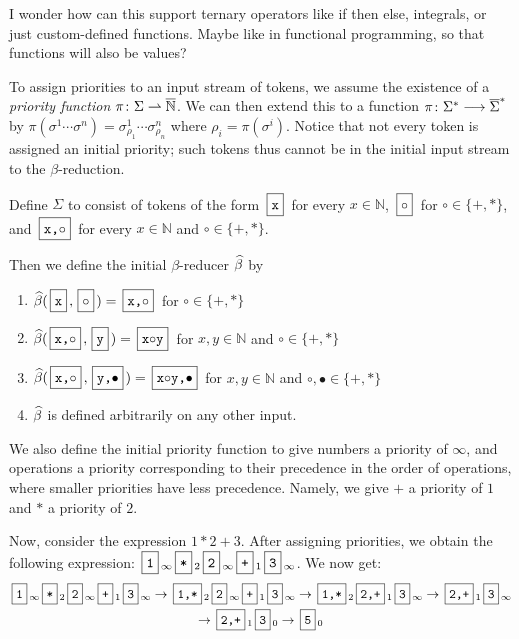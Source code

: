 \documentclass{llncs}
\newcommand{\yoni}[1]{{\begin{mdframed}[linecolor=red]{\color{red}#1}\end{mdframed}}}
\begin{document}
\yoni{I wonder how can this support ternary operators like if then else, integrals, or just custom-defined functions. Maybe like in functional programming, so that functions will also be values?}

To assign priorities to an input stream of tokens, we assume the existence of a \textit{priority function} $\pi\colon\Sigma\rightharpoonup\overline{\mathbb N}$.
We can then extend this to a function $\pi\colon\Sigma^*\longrightarrow\overline\Sigma^*$ by $\pi(\sigma^1\cdots\sigma^n)=\sigma^1_{\rho_1}\cdots\sigma^n_{\rho_n}$ where $\rho_i=\pi(\sigma^i)$.
Notice that not every token is assigned an initial priority; such tokens thus cannot be in the initial input stream to the $\beta$-reduction.



\begin{example}

    Define $\Sigma$ to consist of tokens of the form $\mbt{x}$ for every $x\in\mathbb{N}$, $\mb\circ$ for $\circ\in\{+,*\}$, and $\mbt{x,$\circ$}$ for every $x\in\mathbb{N}$
    and $\circ\in\{+,*\}$.
    
    Then we define the initial $\beta$-reducer $\widehat\beta$ by
    \begin{enumerate}
        \item $\hb(\mbt x,\mb\circ)=\mbt{x,$\circ$}$ for $\circ\in\{+,*\}$
        \item $\hb(\mbt{x,$\circ$},\mbt y)=\mbt{x$\circ$y}$ for 
        $x,y\in\mathbb{N}$ and $\circ\in\{+,*\}$
        \item $\hb(\mbt{x,$\circ$},\mbt{y,$\bullet$})=\mbt{x$\circ$y,$\bullet$}$ 
        for $x,y\in\mathbb{N}$ and $\circ,\bullet\in\{+,*\}$
        \item $\widehat\beta$ is defined arbitrarily on any other input.
    \end{enumerate}
    
    We also define the initial priority function to give numbers a priority of $\infty$, and operations a priority corresponding to their precedence in the order of operations,
    where smaller priorities have less precedence.
    Namely, we give $+$ a priority of $1$ and $*$ a priority of $2$.
    
    Now, consider the expression $1*2+3$. 
    After assigning priorities, we obtain the following expression:
    $\mbt1_\infty \mbt*_2 \mbt2_\infty \mbt+_1 \mbt3_\infty$.
    We now get:
    \begin{multline*}
        \mbt1_\infty \mbt*_2 \mbt2_\infty \mbt+_1 \mbt3_\infty \to \mbt{1,*}_2 \mbt2_\infty \mbt+_1 \mbt3_\infty \to \mbt{1,*}_2 \mbt{2,+}_1 \mbt3_\infty \to \mbt{2,+}_1 \mbt3_\infty\\
        \to \mbt{2,+}_1 \mbt3_0 \to \mbt5_0
    \end{multline*}

\end{example}
\end{document}
